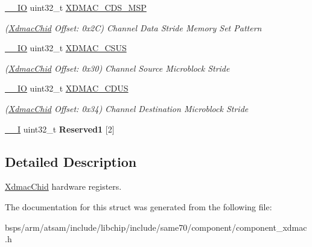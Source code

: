 \begin{DoxyCompactItemize}
\mbox{\label{structXdmacChid_a047398a3a0794fece968f282f45b636f}} 
\mbox{\hyperlink{core__cm7_8h_aec43007d9998a0a0e01faede4133d6be}{\+\_\+\+\_\+\+IO}} uint32\+\_\+t \mbox{\hyperlink{structXdmacChid_a047398a3a0794fece968f282f45b636f}{X\+D\+M\+A\+C\+\_\+\+C\+D\+S\+\_\+\+M\+SP}}
\begin{DoxyCompactList}\small\item\em (\mbox{\hyperlink{structXdmacChid}{Xdmac\+Chid}} Offset\+: 0x2C) Channel Data Stride Memory Set Pattern \end{DoxyCompactList}\item 
\mbox{\label{structXdmacChid_a7e06f0350dc8af037da55c2a3ea20802}} 
\mbox{\hyperlink{core__cm7_8h_aec43007d9998a0a0e01faede4133d6be}{\+\_\+\+\_\+\+IO}} uint32\+\_\+t \mbox{\hyperlink{structXdmacChid_a7e06f0350dc8af037da55c2a3ea20802}{X\+D\+M\+A\+C\+\_\+\+C\+S\+US}}
\begin{DoxyCompactList}\small\item\em (\mbox{\hyperlink{structXdmacChid}{Xdmac\+Chid}} Offset\+: 0x30) Channel Source Microblock Stride \end{DoxyCompactList}\item 
\mbox{\label{structXdmacChid_a9cf9094ee6fa6d8ca235dc5b019df206}} 
\mbox{\hyperlink{core__cm7_8h_aec43007d9998a0a0e01faede4133d6be}{\+\_\+\+\_\+\+IO}} uint32\+\_\+t \mbox{\hyperlink{structXdmacChid_a9cf9094ee6fa6d8ca235dc5b019df206}{X\+D\+M\+A\+C\+\_\+\+C\+D\+US}}
\begin{DoxyCompactList}\small\item\em (\mbox{\hyperlink{structXdmacChid}{Xdmac\+Chid}} Offset\+: 0x34) Channel Destination Microblock Stride \end{DoxyCompactList}\item 
\mbox{\label{structXdmacChid_a9fb5755e961817b39ce1674372fb6173}} 
\mbox{\hyperlink{core__cm7_8h_af63697ed9952cc71e1225efe205f6cd3}{\+\_\+\+\_\+I}} uint32\+\_\+t {\bfseries Reserved1} \mbox{[}2\mbox{]}
\end{DoxyCompactItemize}


\subsection{Detailed Description}
\mbox{\hyperlink{structXdmacChid}{Xdmac\+Chid}} hardware registers. 

The documentation for this struct was generated from the following file\+:\begin{DoxyCompactItemize}
\item 
bsps/arm/atsam/include/libchip/include/same70/component/component\+\_\+xdmac.\+h\end{DoxyCompactItemize}
